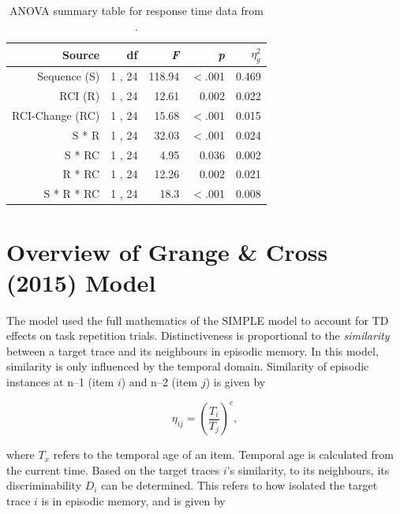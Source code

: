 \documentclass[a4paper, jou, natbib]{apa6}
\begin{document}
\begin{table}[htbp]
  \centering
  \caption{ANOVA summary table for response time data from \cite{Grangeinrevision}.}
    \begin{tabular}{rrrrr}
    \toprule
    Source & df    & \emph{F}     & \emph{p}     & $\eta_{g}^{2}$ \\
    \midrule
    Sequence (S) & 1 , 24 & 118.94 & $<$.001 & 0.469 \\
    RCI (R) & 1 , 24 & 12.61 & 0.002 & 0.022 \\
    RCI-Change (RC) & 1 , 24 & 15.68 & $<$.001 & 0.015 \\
    S * R & 1 , 24 & 32.03 & $<$.001 & 0.024 \\
    S * RC & 1 , 24 & 4.95  & 0.036 & 0.002 \\
    R * RC & 1 , 24 & 12.26 & 0.002 & 0.021 \\
    S * R * RC & 1 , 24 & 18.3  & $<$.001 & 0.008 \\
    \bottomrule
    \end{tabular}%
  \label{tab:grangeData}%
\end{table}%



\appendix
\section{Overview of Grange \& Cross (2015) Model}
The \cite{Grange2015} model used the full mathematics of the SIMPLE \cite{Brown2007} model to account for TD effects on task repetition trials. Distinctiveness is proportional to the \emph{similarity} between a target trace and its neighbours in episodic memory. In this model, similarity is only influenced by the temporal domain. Similarity of episodic instances at n--1 (item $i$) and n--2 (item $j$) is given by

\begin{equation}
\eta_{ij} = \left(\frac{T_{i}}{T_{j}}\right)^{c}, 
\label{eq:simpleSimilarity}
\end{equation}

\noindent where $T_{x}$ refers to the temporal age of an item. Temporal age is calculated from the current time. Based on the target traces $i$'s similarity, to its neighbours, its discriminability $D_{i}$ can be determined. This refers to how isolated the target trace $i$ is in episodic memory, and is given by
\end{document}
